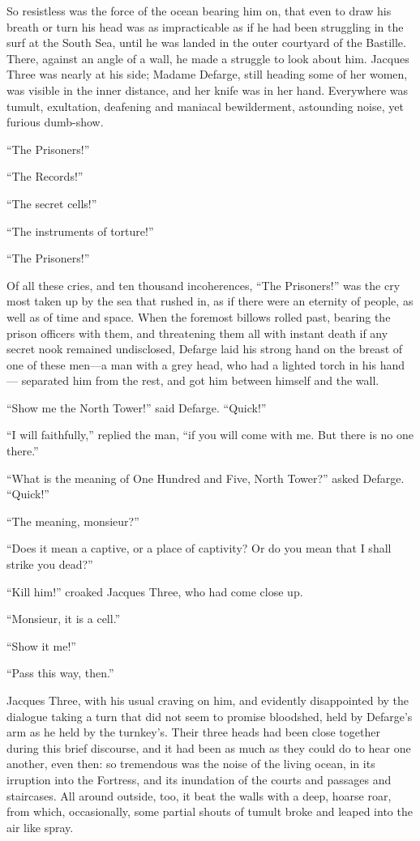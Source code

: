 So resistless was the force of the ocean bearing him on, that even
to draw his breath or turn his head was as impracticable as if he had
been struggling in the surf at the South Sea, until he was landed in
the outer courtyard of the Bastille.  There, against an angle of a
wall, he made a struggle to look about him.  Jacques Three was nearly
at his side; Madame Defarge, still heading some of her women, was
visible in the inner distance, and her knife was in her hand.  Everywhere
was tumult, exultation, deafening and maniacal bewilderment, astounding
noise, yet furious dumb-show.

``The Prisoners!''

``The Records!''

``The secret cells!''

``The instruments of torture!''

``The Prisoners!''

Of all these cries, and ten thousand incoherences, ``The Prisoners!''
was the cry most taken up by the sea that rushed in, as if there were
an eternity of people, as well as of time and space.  When the foremost
billows rolled past, bearing the prison officers with them, and
threatening them all with instant death if any secret nook remained
undisclosed, Defarge laid his strong hand on the breast of one of
these men---a man with a grey head, who had a lighted torch in his hand---%
separated him from the rest, and got him between himself and the wall.

``Show me the North Tower!'' said Defarge.  ``Quick!''

``I will faithfully,'' replied the man, ``if you will come with me.  But
there is no one there.''

``What is the meaning of One Hundred and Five, North Tower?''
asked Defarge.  ``Quick!''

``The meaning, monsieur?''

``Does it mean a captive, or a place of captivity?  Or do you mean that
I shall strike you dead?''

``Kill him!'' croaked Jacques Three, who had come close up.

``Monsieur, it is a cell.''

``Show it me!''

``Pass this way, then.''

Jacques Three, with his usual craving on him, and evidently
disappointed by the dialogue taking a turn that did not seem to promise
bloodshed, held by Defarge's arm as he held by the turnkey's.  Their
three heads had been close together during this brief discourse, and
it had been as much as they could do to hear one another, even then:
so tremendous was the noise of the living ocean, in its irruption into
the Fortress, and its inundation of the courts and passages and
staircases.  All around outside, too, it beat the walls with a deep,
hoarse roar, from which, occasionally, some partial shouts of tumult
broke and leaped into the air like spray.

